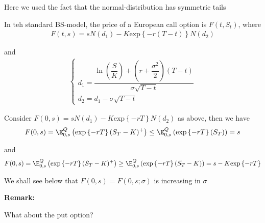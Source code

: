 \par\bigskip
\noindent Here we used the fact that the normal-distribution has symmetric tails
\par\bigskip
\begin{theo}{}
  In teh standard BS-model, the price of a European call option is $F(t,S_t)$, where 
  \begin{equation*}
    \begin{gathered}
      F(t,s) = sN(d_1)-K\text{exp}\left\{-r(T-t)\right\}N(d_2)
    \end{gathered}
  \end{equation*}\par
  \noindent and
  \begin{equation*}
    \begin{gathered}
      \begin{cases}
        d_1 = \dfrac{\ln{\left(\dfrac{S}{K}\right)}+(r+\dfrac{\sigma^2}{2})(T-t)}{\sigma\sqrt{T-t}}\\
        d_2 = d_1 -\sigma\sqrt{T-t}
      \end{cases}
    \end{gathered}
  \end{equation*}
\end{theo}
\par\bigskip
\noindent Consider $F(0,s) = sN(d_1)-K\text{exp}\left\{-rT\right\}N(d_2)$ as above, then we have
\begin{equation*}
  \begin{gathered}
    F(0,s) = \E_{0,s}^Q\left(\text{exp}\left\{-rT\right\}(S_T-K)^+\right)\leq \E_{0,s}^Q\left(\text{exp}\left\{-rT\right\}(S_T)\right) = s
  \end{gathered}
\end{equation*}
\par\bigskip
\noindent and
\begin{equation*}
  \begin{gathered}
    F(0,s) = \E_{0,s}^Q\left(\text{exp}\left\{-rT\right\}(S_T-K)^+\right)\geq \E_{0,s}^Q\left(\text{exp}\left\{-rT\right\}(S_T-K)\right) = s-K\text{exp}\left\{-rT\right\}
  \end{gathered}
\end{equation*}\par
\noindent We shall see below that $F(0,s) = F(0,s;\sigma)$ is increasing in $\sigma$
\par\bigskip
\noindent\textbf{Remark:}\par
\noindent What about the put option?\par
